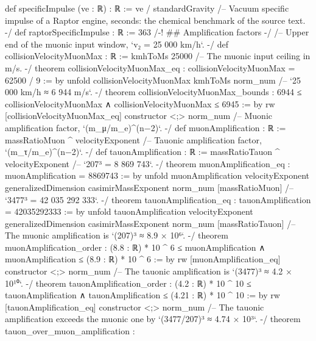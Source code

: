 \documentclass[11pt,a4paper]{article}
\begin{document}
{def specificImpulse (ve : ℝ) : ℝ := ve / standardGravity
\mbox{}
/-- Vacuum specific impulse of a Raptor engine, seconds: the chemical benchmark
of the source text. -/
def raptorSpecificImpulse : ℝ := 363
\mbox{}
/-! \#\# Amplification factors -/
\mbox{}
/-- Upper end of the muonic input window, `v₂ = 25 000 km/h`. -/
def collisionVelocityMuonMax : ℝ := kmhToMs 25000
\mbox{}
/-- The muonic input ceiling in m/s. -/
theorem collisionVelocityMuonMax\_\allowbreak{}eq : collisionVelocityMuonMax = 62500 / 9 := by
  unfold collisionVelocityMuonMax kmhToMs
  norm\_\allowbreak{}num
\mbox{}
/-- `25 000 km/h ≈ 6 944 m/s`. -/
theorem collisionVelocityMuonMax\_\allowbreak{}bounds :
    6944 ≤ collisionVelocityMuonMax ∧ collisionVelocityMuonMax ≤ 6945 := by
  rw [collisionVelocityMuonMax\_\allowbreak{}eq]
  constructor \textless{};\textgreater{} norm\_\allowbreak{}num
\mbox{}
/-- Muonic amplification factor, `(m\_\allowbreak{}μ/m\_\allowbreak{}e)\textasciicircum{}(n−2)`. -/
def muonAmplification : ℝ := massRatioMuon \textasciicircum{} velocityExponent
\mbox{}
/-- Tauonic amplification factor, `(m\_\allowbreak{}τ/m\_\allowbreak{}e)\textasciicircum{}(n−2)`. -/
def tauonAmplification : ℝ := massRatioTauon \textasciicircum{} velocityExponent
\mbox{}
/-- `207³ = 8 869 743`. -/
theorem muonAmplification\_\allowbreak{}eq : muonAmplification = 8869743 := by
  unfold muonAmplification velocityExponent generalizedDimension casimirMassExponent
  norm\_\allowbreak{}num [massRatioMuon]
\mbox{}
/-- `3477³ = 42 035 292 333`. -/
theorem tauonAmplification\_\allowbreak{}eq : tauonAmplification = 42035292333 := by
  unfold tauonAmplification velocityExponent generalizedDimension casimirMassExponent
  norm\_\allowbreak{}num [massRatioTauon]
\mbox{}
/-- The muonic amplification is `(207)³ ≈ 8.9 × 10⁶`. -/
theorem muonAmplification\_\allowbreak{}order :
    (8.8 : ℝ) * 10 \textasciicircum{} 6 ≤ muonAmplification ∧ muonAmplification ≤ (8.9 : ℝ) * 10 \textasciicircum{} 6 := by
  rw [muonAmplification\_\allowbreak{}eq]
  constructor \textless{};\textgreater{} norm\_\allowbreak{}num
\mbox{}
/-- The tauonic amplification is `(3477)³ ≈ 4.2 × 10¹⁰`. -/
theorem tauonAmplification\_\allowbreak{}order :
    (4.2 : ℝ) * 10 \textasciicircum{} 10 ≤ tauonAmplification ∧ tauonAmplification ≤ (4.21 : ℝ) * 10 \textasciicircum{} 10 := by
  rw [tauonAmplification\_\allowbreak{}eq]
  constructor \textless{};\textgreater{} norm\_\allowbreak{}num
\mbox{}
/-- The tauonic amplification exceeds the muonic one by `(3477/207)³ ≈ 4.74 × 10³`. -/
theorem tauon\_\allowbreak{}over\_\allowbreak{}muon\_\allowbreak{}amplification :
}
\end{document}
